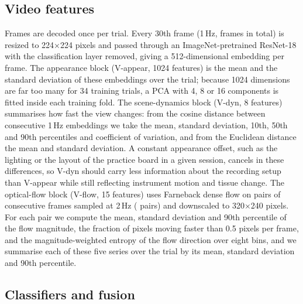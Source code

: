 \subsection{Video features}

Frames are decoded once per trial. Every 30th frame (1\,Hz, \NFramesOneHz{} frames in total) is resized to 224$\times$224 pixels and passed through an ImageNet-pretrained ResNet-18 \citep{he2016resnet} with the classification layer removed, giving a 512-dimensional embedding per frame. The appearance block (V-appear, 1024 features) is the mean and the standard deviation of these embeddings over the trial; because 1024 dimensions are far too many for 34 training trials, a PCA with 4, 8 or 16 components is fitted inside each training fold. The scene-dynamics block (V-dyn, 8 features) summarises how fast the view changes: from the cosine distance between consecutive 1\,Hz embeddings we take the mean, standard deviation, 10th, 50th and 90th percentiles and coefficient of variation, and from the Euclidean distance the mean and standard deviation. A constant appearance offset, such as the lighting or the layout of the practice board in a given session, cancels in these differences, so V-dyn should carry less information about the recording setup than V-appear while still reflecting instrument motion and tissue change. The optical-flow block (V-flow, 15 features) uses Farneback dense flow \citep{farneback2003flow} on pairs of consecutive frames sampled at 2\,Hz (\NPairsTwoHz{} pairs) and downscaled to 320$\times$240 pixels. For each pair we compute the mean, standard deviation and 90th percentile of the flow magnitude, the fraction of pixels moving faster than 0.5 pixels per frame, and the magnitude-weighted entropy of the flow direction over eight bins, and we summarise each of these five series over the trial by its mean, standard deviation and 90th percentile.

\subsection{Classifiers and fusion}

